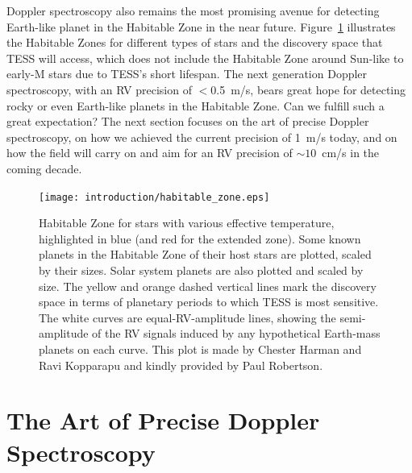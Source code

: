 Doppler spectroscopy also remains the most promising avenue for
detecting Earth-like planet in the Habitable Zone
\citep{1993Icar..101..108K, 2013ApJ...765..131K} in the near
future. Figure~\ref{intro:fig:hz} illustrates the Habitable Zones for
different types of stars and the discovery space that TESS will
access, which does not include the Habitable Zone around Sun-like to
early-M stars due to TESS's short lifespan. The next generation
Doppler spectroscopy, with an RV precision of $<$0.5~m/s, bears great
hope for detecting rocky or even Earth-like planets in the Habitable
Zone. Can we fulfill such a great expectation? The next section
focuses on the art of precise Doppler spectroscopy, on how we achieved
the current precision of 1~m/s today, and on how the field will carry
on and aim for an RV precision of $\sim 10$~cm/s in the coming decade.


\begin{figure}
\centering
\texttt{[image: introduction/habitable\_zone.eps]}
\caption{Habitable Zone for stars with various effective temperature,
highlighted in blue (and red for the extended zone). Some known
planets in the Habitable Zone of their host stars are plotted, scaled
by their sizes. Solar system planets are also plotted and scaled by
size. The yellow and orange dashed vertical lines mark the discovery
space in terms of planetary periods to which TESS is most
sensitive. The white curves are equal-RV-amplitude lines, showing the
semi-amplitude of the RV signals induced by any hypothetical
Earth-mass planets on each curve. This plot is made by Chester Harman
and Ravi Kopparapu and kindly provided by Paul Robertson.
\label{intro:fig:hz}}
\end{figure}



\section{The Art of Precise Doppler Spectroscopy}

